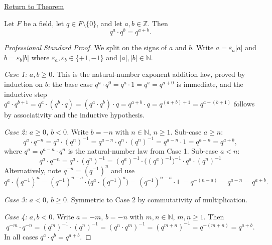 \newpage
{}
\label{prf:integer-exponent-addition-law}

\begin{remark*}[Return]
\hyperref[thm:integer-exponent-addition-law]{Return to Theorem}
\end{remark*}

\begin{theorem*}
Let $F$ be a field, let $q\in F\setminus\{0\}$, and let $a,b\in\mathbb{Z}$.
Then
\[
q^a\cdot q^b = q^{a+b}.
\]
\end{theorem*}

\begin{proof}[Professional Standard Proof]
\LRAProofBodyStart
We split on the signs of $a$ and $b$.  Write $a = \varepsilon_a|a|$ and
$b = \varepsilon_b|b|$ where $\varepsilon_a,\varepsilon_b\in\{+1,-1\}$ and
$|a|,|b|\in\mathbb{N}$.

\emph{Case 1: $a,b\geq 0$.}
This is the natural-number exponent addition law, proved by induction on $b$:
the base case $q^a\cdot q^0 = q^a\cdot 1 = q^a = q^{a+0}$ is immediate, and
the inductive step
$q^a\cdot q^{b+1} = q^a\cdot(q^b\cdot q) = (q^a\cdot q^b)\cdot q
= q^{a+b}\cdot q = q^{(a+b)+1} = q^{a+(b+1)}$ follows by associativity and
the inductive hypothesis.

\emph{Case 2: $a\geq 0$, $b<0$.}
Write $b = -n$ with $n\in\mathbb{N}$, $n\geq 1$.  Sub-case $a\geq n$:
\[
q^a\cdot q^{-n}
= q^a\cdot(q^n)^{-1}
= q^{a-n}\cdot q^n\cdot(q^n)^{-1}
= q^{a-n}\cdot 1
= q^{a-n}
= q^{a+b},
\]
where $q^a = q^{a-n}\cdot q^n$ is the natural-number law from Case 1.
Sub-case $a < n$:
\[
q^a\cdot q^{-n}
= q^a\cdot(q^n)^{-1}
= (q^a)^{-1}\cdot\bigl((q^a)^{-1}\bigr)^{-1}\cdot q^a\cdot(q^n)^{-1}
\]
Alternatively, note $q^{-n} = (q^{-1})^n$ and use
\[
q^a\cdot(q^{-1})^n = (q^{-1})^{n-a}\cdot\bigl(q^a\cdot(q^{-1})^a\bigr)
= (q^{-1})^{n-a}\cdot 1^{\,} = q^{-(n-a)} = q^{a-n} = q^{a+b}.
\]

\emph{Case 3: $a<0$, $b\geq 0$.}  Symmetric to Case 2 by commutativity of
multiplication.

\emph{Case 4: $a,b<0$.}  Write $a = -m$, $b = -n$ with $m,n\in\mathbb{N}$,
$m,n\geq 1$.  Then
\[
q^{-m}\cdot q^{-n}
= (q^m)^{-1}\cdot(q^n)^{-1}
= (q^n\cdot q^m)^{-1}
= (q^{m+n})^{-1}
= q^{-(m+n)}
= q^{a+b}.
\]
In all cases $q^a\cdot q^b = q^{a+b}$.
\end{proof}

